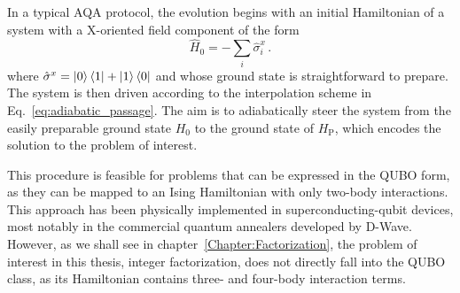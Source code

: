 In a typical AQA protocol, the evolution begins with an initial Hamiltonian of a system with a X-oriented field component of the form
\begin{equation}
    \hat{H}_0 = - \sum_i \hat{\sigma}_i^x\,.
    \label{eq:transverse_field_hamiltonian}
\end{equation}
where $\hat{\sigma}^x = \ket{0}\bra{1}+\ket{1}\bra{0}$ and whose ground state is straightforward to prepare. The system is then driven according to the interpolation scheme in Eq.~\eqref{eq:adiabatic_passage}. The aim is to adiabatically steer the system from the easily preparable ground state $H_0$ to the ground state of $H_\mathrm{P}$, which encodes the solution to the problem of interest.

This procedure is feasible for problems that can be expressed in the QUBO form, as they can be mapped to an Ising Hamiltonian with only two-body interactions. This approach has been physically implemented in superconducting-qubit devices, most notably in the commercial quantum annealers developed by D-Wave. However, as we shall see in chapter~\ref{Chapter:Factorization}, the problem of interest in this thesis, integer factorization, does not directly fall into the QUBO class, as its Hamiltonian contains three- and four-body interaction terms.